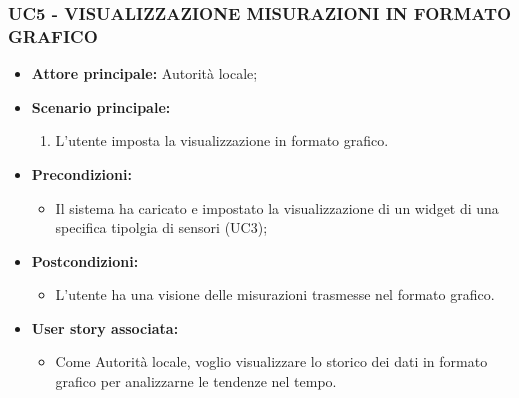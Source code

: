 \subsubsection{UC5 - VISUALIZZAZIONE MISURAZIONI IN FORMATO GRAFICO}
\begin{itemize}
    \item \textbf{Attore principale:} Autorità locale;
    \item \textbf{Scenario principale:}
          \begin{enumerate}
              \item L'utente imposta la visualizzazione in formato grafico.
          \end{enumerate}
    \item \textbf{Precondizioni:}
          \begin{itemize}
            \item Il sistema ha caricato e impostato la visualizzazione di un widget di una specifica tipolgia di sensori (UC3);
          \end{itemize}
    \item \textbf{Postcondizioni:}
          \begin{itemize}
              \item  L'utente ha una visione delle misurazioni trasmesse nel formato grafico.
          \end{itemize}
    \item \textbf{User story associata:}
          \begin{itemize}
              \item Come Autorità locale, voglio visualizzare lo storico dei dati in formato grafico per analizzarne le tendenze nel tempo.
          \end{itemize}
\end{itemize}